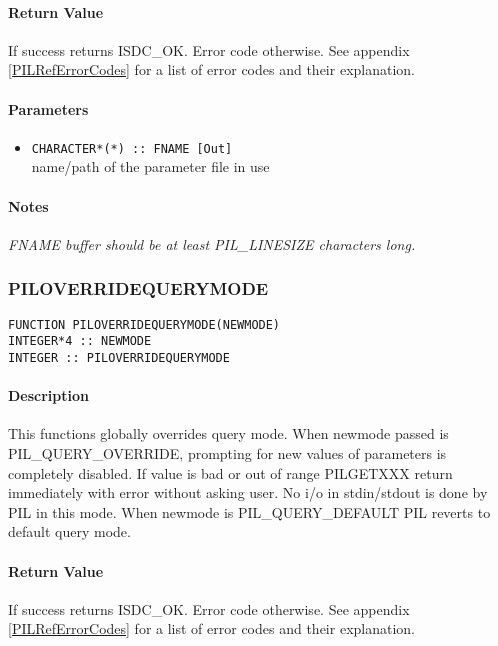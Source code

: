 \paragraph{Return Value\\}
If success returns ISDC\_OK. Error code otherwise. See appendix \ref{PILRefErrorCodes}
for a list of error codes and their explanation.

\paragraph{Parameters}
\begin{itemize}
\item
{\tt CHARACTER*(*) :: FNAME [Out] } \\
name/path of the parameter file in use 
\end{itemize}

\paragraph{Notes\\}
{\it
FNAME buffer should be at least PIL\_LINESIZE characters long. 
}



\subsubsection{PILOVERRIDEQUERYMODE}

\begin{verbatim}
FUNCTION PILOVERRIDEQUERYMODE(NEWMODE) 
INTEGER*4 :: NEWMODE 
INTEGER :: PILOVERRIDEQUERYMODE 
\end{verbatim}

\paragraph{Description\\}
This functions globally overrides query mode. When newmode passed is
PIL\_QUERY\_OVERRIDE, prompting for
new values of parameters is completely disabled. If value is bad or out of
range PILGETXXX return immediately
with error without asking user. No i/o in stdin/stdout is done by PIL in
this mode. When newmode is
PIL\_QUERY\_DEFAULT PIL reverts to default query mode. 

\paragraph{Return Value\\}
If success returns ISDC\_OK. Error code otherwise. See appendix \ref{PILRefErrorCodes}
for a list of error codes and their explanation.

